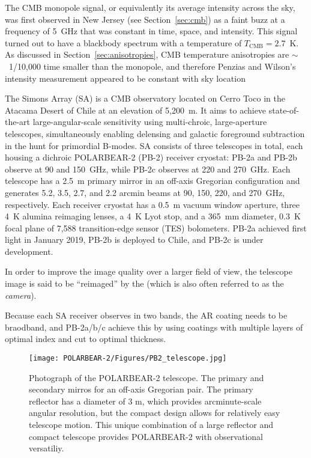 The CMB monopole signal, or equivalently its average intensity across the sky, was first observed in New Jersey (see Section~\ref{sec:cmb}) as a faint buzz at a frequency of 5~GHz that was constant in time, space, and intensity. This signal turned out to have a blackbody spectrum with a temperature of $T_{\mathrm{CMB}} = 2.7$~K. As discussed in Section~\ref{sec:anisotropies}, CMB temperature anisotropies are $\sim$~1/10,000 time smaller than the monopole, and therefore Penzias and Wilson's intensity measurement appeared to be constant with sky location

The Simons Array (SA) is a CMB observatory located on Cerro Toco in the Atacama Desert of Chile at an elevation of 5,200~m. It aims to achieve state-of-the-art large-angular-scale sensitivity using multi-chroic, large-aperture telescopes, simultaneously enabling delensing and galactic foreground subtraction in the hunt for primordial B-modes. SA consists of three telescopes in total, each housing a dichroic POLARBEAR-2 (PB-2) receiver cryostat: PB-2a and PB-2b observe at 90 and 150~GHz, while PB-2c observes at 220 and 270~GHz. Each telescope has a 2.5~m primary mirror in an off-axis Gregorian configuration\cite{tran_comparison_2008} and generates 5.2, 3.5, 2.7, and 2.2 arcmin beams at 90, 150, 220, and 270~GHz, respectively.  Each receiver cryostat has a 0.5~m vacuum window aperture, three 4~K alumina reimaging lenses, a 4~K Lyot stop, and a 365~mm diameter, 0.3~K focal plane of 7,588 transition-edge sensor (TES) bolometers. PB-2a achieved first light in January 2019,\cite{kaneko_deployment_2020} PB-2b\cite{howe_design_2018} is deployed to Chile, and PB-2c is under development.

In order to improve the image quality over a larger field of view, the telescope image is said to be ``reimaged'' by the  (which is also often referred to as the \textit{camera}). 

Because each SA receiver observes in two bands, the AR coating needs to be braodband, and PB-2a/b/c achieve this by using coatings with multiple layers of optimal index and cut to optimal thickness.

\begin{figure}
    \centering
    \texttt{[image: POLARBEAR-2/Figures/PB2\_telescope.jpg]}
    \caption[POLARBEAR-2 telescope]{Photograph of the POLARBEAR-2 telescope. The primary and secondary mirros for an off-axis Gregorian pair. The primary reflector has a diameter of 3 m, which provides arcminute-scale angular resolution, but the compact design allows for relatively easy telescope motion. This unique combination of a large reflector and compact telescope provides POLARBEAR-2 with observational versatiliy.}
    \label{fig:pb2_telescope}
\end{figure}

